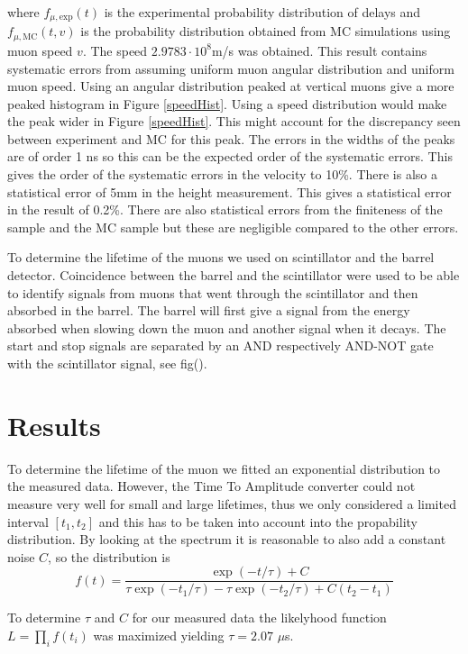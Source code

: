 \documentclass[10pt,twocolumn]{article}
\begin{document}
where $f_{\mu,\mathrm{exp}}(t)$ is the experimental probability distribution of delays and $f_{\mu,\mathrm{MC}}(t,v)$ is the probability distribution obtained from MC simulations using muon speed $v$. The speed $2.9783\cdot10^8$m/s was obtained. This result contains systematic errors from assuming uniform muon angular distribution and uniform muon speed. Using an angular distribution peaked at vertical muons give a more peaked histogram in Figure \ref{speedHist}. Using a speed distribution would make the peak wider in Figure \ref{speedHist}. This might account for the discrepancy seen between experiment and MC for this peak. The errors in the widths of the peaks are of order 1 ns so this can be the expected order of the systematic errors. This gives the order of the systematic errors in the velocity to 10\%. There is also a statistical error of 5mm in the height measurement. This gives a statistical error in the result of 0.2\%. There are also statistical errors from the finiteness of the sample and the MC sample but these are negligible compared to the other errors.

To determine the lifetime of the muons we used on scintillator and the barrel detector. Coincidence between the barrel and the scintillator were used to be able to identify signals from muons that went through the scintillator and then absorbed in the barrel. The barrel will first give a signal from the energy absorbed when slowing down the muon and another signal when it decays. The start and stop signals are separated by an AND respectively AND-NOT gate with the scintillator signal, see fig().

\section{Results}
To determine the lifetime of the muon we fitted an exponential distribution to the measured data. However, the Time To Amplitude converter could not measure very well for small and large lifetimes, thus we only considered a limited interval $[t_1,t_2]$ and this has to be taken into account into the propability distribution. By looking at the spectrum it is reasonable to also add a constant noise $C$, so the distribution is
\begin{equation}
f(t)=\frac{\exp{(-t/\tau)}+C}{\tau\exp{(-t_1/\tau)}-\tau\exp{(-t_2/\tau)}+C(t_2-t_1)}\label{pdf}
\end{equation}

To determine $\tau$ and $C$ for our measured data the likelyhood function $L=\prod_i f(t_i)$ was maximized yielding $\tau=2.07$ $\mu$s. \newline
\end{document}
